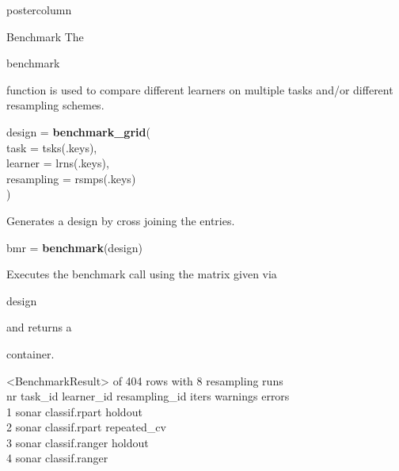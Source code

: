 \documentclass{beamer}
\newlength{\columnheight} %
\newcommand{\codeinline}[1]{\begin{codeboxinline}#1\end{codeboxinline}}
\begin{document}
\begin{withoutheader}
\begin{frame}[fragile]{}
\begin{columns}
\begin{column}{.245\textwidth}
\begin{beamercolorbox}[center]{postercolumn}
				\begin{minipage}{.98\textwidth}
					\parbox[t][\columnheight]{\textwidth}{
						\begin{myblock}{Benchmark}
						The \codeinline{benchmark} function is used to compare different learners on multiple tasks and/or different resampling schemes.
						\\
						\begin{codeboxmultiline}[width=21.95cm]
							design = \textbf{benchmark\_grid}(\\
							\hspace*{1ex}task = tsks(.keys),\\
							\hspace*{1ex}learner = lrns(.keys),\\
							\hspace*{1ex}resampling = rsmps(.keys)\\
							)
						\end{codeboxmultiline}
						Generates a design by cross joining the entries.
						\begin{codebox}
							bmr = \textbf{benchmark}(design)
						\end{codebox}
						Executes the benchmark call
						using the matrix given via \codeinline{design} and
						returns a \codeinline{}
						container.\\
						\begin{codeboxmultiline}[width=27cm]
							\scriptsize{
								<BenchmarkResult> of 404 rows with 8 resampling runs\\
								nr task\_id \space\space\space\space learner\_id resampling\_id iters warnings errors\\
								1 \space\space\space sonar \space classif.rpart
								\space\space\space\space\space\space holdout
								\space\space\space\space 1
								\space\space\space\space\space\space\space 0
								\space\space\space\space\space 0\\
								2 \space\space\space sonar \space classif.rpart
								\space\space repeated\_cv
								\space{}00
								\space\space\space\space\space\space{}
								\space\space\space\space{}\\
								3 \space\space\space sonar classif.ranger
								\space\space\space\space\space\space holdout
								\space\space\space\space 1
								\space\space\space\space\space\space{}
								\space\space\space\space{}\\
								4 \space\space\space sonar classif.ranger
}
\end{codeboxmultiline}
\end{myblock}}
\end{minipage}
\end{beamercolorbox}
\end{column}
\end{columns}
\end{frame}
\end{withoutheader}
\end{document}
